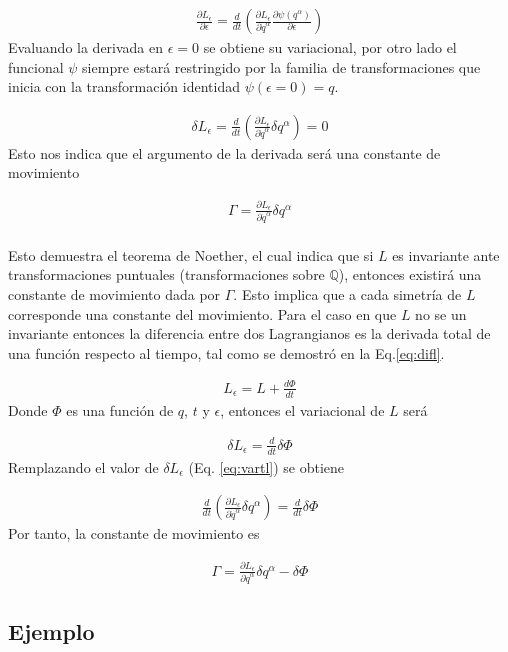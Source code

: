\begin{gather*}
    \frac{\partial L_\epsilon}{\partial \epsilon} = \frac{d}{dt}\left(\frac{\partial L_\epsilon}{\partial \dot{q}^{\alpha}}\frac{\partial \psi(q^{\alpha})}{\partial \epsilon}\right) 
\end{gather*}
Evaluando la derivada en $\epsilon = 0$ se obtiene su variacional, por otro lado el funcional $\psi$ siempre estará restringido por la familia de transformaciones que inicia con la transformación identidad $\psi(\epsilon = 0) = q$.

\begin{gather}
    \label{eq:vartl}\delta L_\epsilon = \frac{d}{dt}\left(\frac{\partial L_\epsilon}{\partial \dot{q}^{\alpha}}\delta q^{\alpha}\right)  = 0
\end{gather}
Esto nos indica que el argumento de la derivada será una constante de movimiento  

\begin{gather}
    \label{eq:noet}\Gamma = \frac{\partial L_\epsilon}{\partial \dot{q}^{\alpha}}\delta q^{\alpha}
\end{gather}
\\
Esto demuestra el teorema de Noether, el cual indica que si $L$ es invariante ante transformaciones puntuales (transformaciones sobre $\mathbb{Q}$), entonces existirá una constante de movimiento dada por $\Gamma$. Esto implica que a cada simetría de $L$ corresponde una constante del movimiento.\newline
Para el caso en que $L$ no se un invariante entonces la diferencia entre dos Lagrangianos es la derivada total de una función respecto al tiempo, tal como se demostró en la Eq.\ref*{eq:difl}.

\begin{gather*}
    L_\epsilon = L + \frac{d\Phi}{dt}
\end{gather*}
Donde $\Phi$ es una función de $q$, $t$ y $\epsilon$, entonces el variacional de $L$ será 

\begin{gather*}
    \delta L_\epsilon = \frac{d}{dt}\delta \Phi
\end{gather*}
Remplazando el valor de $\delta L_\epsilon$ (Eq. \ref*{eq:vartl}) se obtiene

\begin{gather*}
    \frac{d}{dt}\left(\frac{\partial L_\epsilon}{\partial \dot{q}^{\alpha}}\delta q^{\alpha}\right) = \frac{d}{dt}\delta \Phi
\end{gather*}
Por tanto, la constante de movimiento es 

\begin{gather}
    \Gamma = \frac{\partial L_\epsilon}{\partial \dot{q}^{\alpha}}\delta q^{\alpha} - \delta \Phi
\end{gather}

\subsection[short]{Ejemplo}